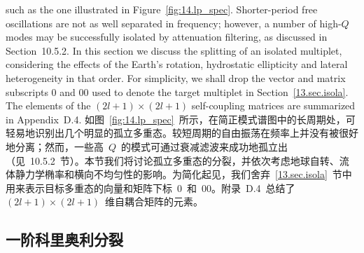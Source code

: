 such as the one illustrated in Figure~\ref{fig:14.lp_spec}.
Shorter-period free oscillations are not as well separated
in frequency; however, a number of high-$Q$ modes may be
successfully isolated by attenuation filtering, as discussed in
Section~10.5.2.  In this section we discuss the splitting
of an isolated multiplet, considering the effects of the
Earth's rotation, hydrostatic ellipticity and lateral
heterogeneity in that order.  For simplicity, we shall
drop the vector and matrix subscripts 0 and 00 used to
denote the target multiplet in Section~\ref{13.sec.isola}.
The elements of the $(2l+1)\times(2l+1)$ self-coupling matrices
are summarized in Appendix~D.4.
\fi
如图~\ref{fig:14.lp_spec}~所示，在简正模式谱图中的长周期处，可轻易地识别出几个明显的孤立多重态。较短周期的自由振荡在频率上并没有被很好地分离；然而，一些高~$Q$~的模式可通过衰减滤波来成功地孤立出（见~10.5.2~节）。本节我们将讨论孤立多重态的分裂，并依次考虑地球自转、流体静力学椭率和横向不均匀性的影响。为简化起见，我们舍弃~\ref{13.sec.isola}~节中用来表示目标多重态的向量和矩阵下标~0~和~00。附录~D.4~总结了~$(2l+1)\times(2l+1)$~维自耦合矩阵的元素。

\subsection{一阶科里奥利分裂}
%
%
\label{section:14.coriolis}

